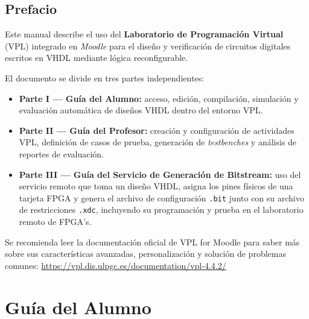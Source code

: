 \documentclass[12pt, a4paper, twoside, openany]{book}
\newcommand{\vpl}{\textsc{VPL}\xspace}
\newcommand{\vhdl}{\textsc{VHDL}\xspace}
\newcommand{\moodle}{\textit{Moodle}\xspace}
\begin{document}
\frontmatter
\tableofcontents
\listoffigures
\listoftables
\clearpage

\chapter*{Prefacio}

Este manual describe el uso del \textbf{Laboratorio de Programación Virtual}
(\vpl) integrado en \moodle para el diseño y verificación de circuitos
digitales escritos en \vhdl mediante lógica reconfigurable.

El documento se divide en tres partes independientes:

\begin{itemize}
  \item \textbf{Parte I — Guía del Alumno:} acceso, edición, compilación,
        simulación y evaluación automática de diseños \vhdl dentro del entorno \vpl.
  \item \textbf{Parte II — Guía del Profesor:} creación y configuración de
        actividades \vpl, definición de casos de prueba, generación de
        \textit{testbenches} y análisis de reportes de evaluación.
  \item \textbf{Parte III — Guía del Servicio de Generación de Bitstream:}
        uso del servicio remoto que toma un diseño \vhdl, asigna los pines
        físicos de una tarjeta FPGA y genera el archivo de configuración
        \texttt{.bit} junto con su archivo de restricciones \texttt{.xdc},
        incluyendo su programación y prueba en el laboratorio remoto de
        FPGA's.
\end{itemize}

\begin{notebox}
  Se recomienda leer la documentación oficial de VPL for Moodle para saber más sobre sus características avanzadas, personalización y solución de problemas comunes: \url{https://vpl.dis.ulpgc.es/documentation/vpl-4.4.2/}
\end{notebox}

\clearpage

\mainmatter

\part{Guía del Alumno}
\end{document}
